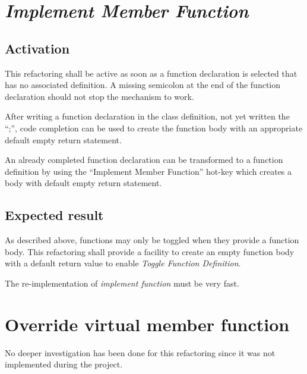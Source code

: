 \section{\textit{Implement Member Function}}

\subsection{Activation}
This refactoring shall be active as soon as a function declaration is selected 
that has no associated definition. A missing semicolon at the end of the 
function declaration should not stop the mechanism to work.

After writing a function declaration in the class definition, not yet written
the ``;'', code completion can be used to create the function body with an
appropriate default empty return statement.\newline

An already completed function declaration can be transformed to a function
definition by using the ``Implement Member Function'' hot-key which creates a
body with default empty return statement.

\subsection{Expected result}
As described above, functions may only be toggled when they provide a function 
body. This refactoring shall provide a facility to create an empty function body 
with a default return value to enable \textit{Toggle Function Definition}.

The re-implementation of \textit{implement function} must be very fast. 

\section{Override virtual member function}

No deeper investigation has been done for this refactoring since it was not 
implemented during the project.

